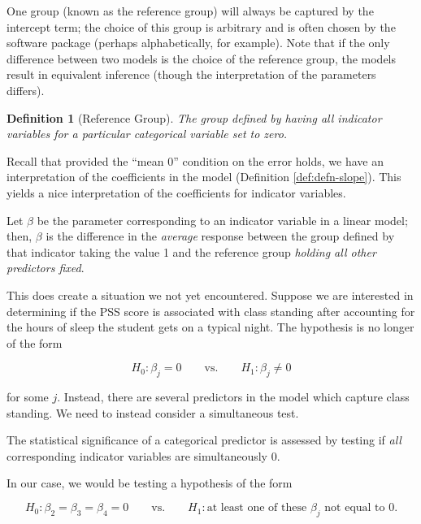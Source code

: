 \documentclass[
]{book}
\theoremstyle{plain}
\theoremstyle{mydefn}
\newtheorem{definition}{Definition}[chapter]
\theoremstyle{myexmpl}
\theoremstyle{remark}
\begin{document}
One group (known as the reference group) will always be captured by the intercept term; the choice of this group is arbitrary and is often chosen by the software package (perhaps alphabetically, for example). Note that if the only difference between two models is the choice of the reference group, the models result in equivalent inference (though the interpretation of the parameters differs).

\begin{definition}[Reference Group]
\protect\hypertarget{def:defn-reference-group}{}{\label{def:defn-reference-group} {} }The group defined by having all indicator variables for a particular categorical variable set to zero.
\end{definition}

Recall that provided the ``mean 0'' condition on the error holds, we have an interpretation of the coefficients in the model (Definition \ref{def:defn-slope}). This yields a nice interpretation of the coefficients for indicator variables.

\begin{rmdkeyidea}
Let \(\beta\) be the parameter corresponding to an indicator variable in a linear model; then, \(\beta\) is the difference in the \emph{average} response between the group defined by that indicator taking the value 1 and the reference group \emph{holding all other predictors fixed}.
\end{rmdkeyidea}

This does create a situation we not yet encountered. Suppose we are interested in determining if the PSS score is associated with class standing after accounting for the hours of sleep the student gets on a typical night. The hypothesis is no longer of the form

\[H_0: \beta_j = 0 \qquad \text{vs.} \qquad H_1: \beta_j \neq 0\]

for some \(j\). Instead, there are several predictors in the model which capture class standing. We need to instead consider a simultaneous test.

\begin{rmdkeyidea}
The statistical significance of a categorical predictor is assessed by testing if \emph{all} corresponding indicator variables are simultaneously 0.
\end{rmdkeyidea}

In our case, we would be testing a hypothesis of the form

\[H_0: \beta_2 = \beta_3 = \beta_4 = 0 \qquad \text{vs.} \qquad H_1: \text{at least one of these } \beta_j \text{ not equal to 0}.\]
\end{document}
